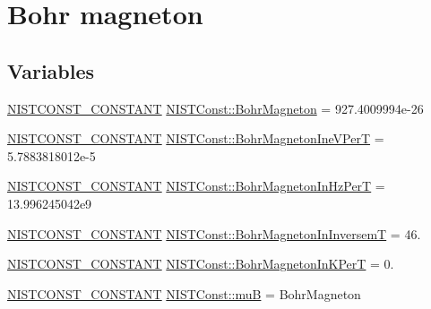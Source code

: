 \hypertarget{group___n_i_s_t_const-_bohr_magneton}{}\section{Bohr magneton}
\label{group___n_i_s_t_const-_bohr_magneton}
\subsection*{Variables}
\begin{DoxyCompactItemize}
\item 
\mbox{\hyperlink{group___n_i_s_t_const-_macros_ga2b0fc1d7452373f816175dd86ce26729}{N\+I\+S\+T\+C\+O\+N\+S\+T\+\_\+\+C\+O\+N\+S\+T\+A\+NT}} \mbox{\hyperlink{group___n_i_s_t_const-_bohr_magneton_ga2804e91f010b40a5c11a46506e6c1926}{N\+I\+S\+T\+Const\+::\+Bohr\+Magneton}} = 927.\+4009994e-\/26
\item 
\mbox{\hyperlink{group___n_i_s_t_const-_macros_ga2b0fc1d7452373f816175dd86ce26729}{N\+I\+S\+T\+C\+O\+N\+S\+T\+\_\+\+C\+O\+N\+S\+T\+A\+NT}} \mbox{\hyperlink{group___n_i_s_t_const-_bohr_magneton_ga5a7384205d0127ffe031897a6b0c3dca}{N\+I\+S\+T\+Const\+::\+Bohr\+Magneton\+Ine\+V\+PerT}} = 5.\+7883818012e-\/5
\item 
\mbox{\hyperlink{group___n_i_s_t_const-_macros_ga2b0fc1d7452373f816175dd86ce26729}{N\+I\+S\+T\+C\+O\+N\+S\+T\+\_\+\+C\+O\+N\+S\+T\+A\+NT}} \mbox{\hyperlink{group___n_i_s_t_const-_bohr_magneton_gaa57dcf7dffc991b2b8ab1009687691e8}{N\+I\+S\+T\+Const\+::\+Bohr\+Magneton\+In\+Hz\+PerT}} = 13.\+996245042e9
\item 
\mbox{\hyperlink{group___n_i_s_t_const-_macros_ga2b0fc1d7452373f816175dd86ce26729}{N\+I\+S\+T\+C\+O\+N\+S\+T\+\_\+\+C\+O\+N\+S\+T\+A\+NT}} \mbox{\hyperlink{group___n_i_s_t_const-_bohr_magneton_ga4ad979b4ddb4aeebcbff236726fa64ec}{N\+I\+S\+T\+Const\+::\+Bohr\+Magneton\+In\+InversemT}} = 46.
\item 
\mbox{\hyperlink{group___n_i_s_t_const-_macros_ga2b0fc1d7452373f816175dd86ce26729}{N\+I\+S\+T\+C\+O\+N\+S\+T\+\_\+\+C\+O\+N\+S\+T\+A\+NT}} \mbox{\hyperlink{group___n_i_s_t_const-_bohr_magneton_gab847d7f91c3980277d352fd100d904f2}{N\+I\+S\+T\+Const\+::\+Bohr\+Magneton\+In\+K\+PerT}} = 0.
\item 
\mbox{\hyperlink{group___n_i_s_t_const-_macros_ga2b0fc1d7452373f816175dd86ce26729}{N\+I\+S\+T\+C\+O\+N\+S\+T\+\_\+\+C\+O\+N\+S\+T\+A\+NT}} \mbox{\hyperlink{group___n_i_s_t_const-_bohr_magneton_ga0bd5a832149b6389c0f2acc2d7894144}{N\+I\+S\+T\+Const\+::muB}} = Bohr\+Magneton

\end{DoxyCompactItemize}
